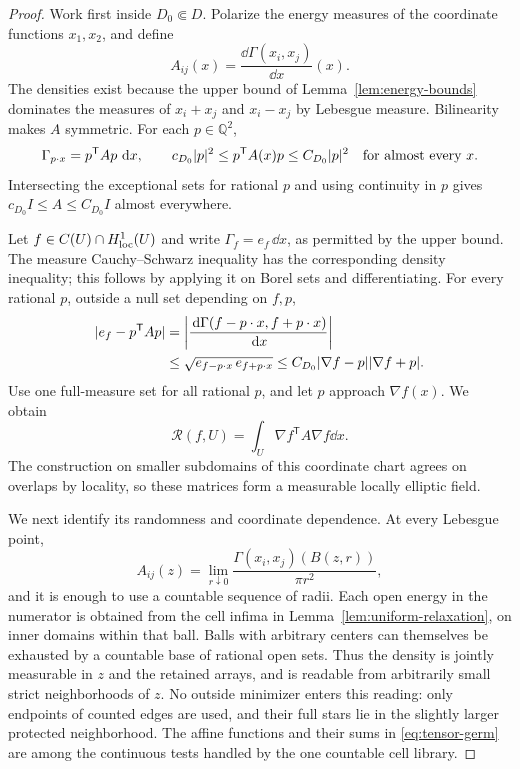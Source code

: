 \begin{proof}
Work first inside \(D_0\Subset D\).  Polarize the energy measures of
the coordinate functions \(x_1,x_2\), and define
\[
 A_{ij}(x)=\frac{\dd\Gamma(x_i,x_j)}{\dd x}(x).
\]
The densities exist because the upper bound of
Lemma~\ref{lem:energy-bounds} dominates the measures of
\(x_i+x_j\) and \(x_i-x_j\) by Lebesgue measure.  Bilinearity makes
\(A\) symmetric.  For each \(p\in\mathbb Q^2\),
\[
 \Gamma_{p\cdot x}=p^{\mathsf T}A p\,\,\mathrm d x,\qquad
 c_{D_0}\lvert p\rvert^2\le p^{\mathsf T}A(x)p
          \le C_{D_0}\lvert p\rvert^2
 \quad\text{for almost every }x.
\]
Intersecting the exceptional sets for rational \(p\) and using continuity
in \(p\) gives \(c_{D_0}I\le A\le C_{D_0}I\) almost everywhere.

Let \(f\in C(U)\cap H^1_{\rm loc}(U)\) and write
\(\Gamma_f=e_f\,\dd x\), as permitted by the upper bound.  The
measure Cauchy--Schwarz inequality has the corresponding density
inequality; this follows by applying it on Borel sets and differentiating.
For every rational \(p\), outside a null set depending on \(f,p\),
\[
 \begin{split}
 \lvert e_f-p^{\mathsf T}A p\rvert
 &=\left|\frac{\,\mathrm d\Gamma(f-p\cdot x,f+p\cdot x)}{\,\mathrm d x}\right|\\
 &\le \sqrt{e_{f-p\cdot x}\,e_{f+p\cdot x}}
 \le C_{D_0}\lvert \nabla f-p\rvert\lvert \nabla f+p\rvert.
 \end{split}
\]
Use one full-measure set for all rational \(p\), and let \(p\) approach
\(\nabla f(x)\).  We obtain
\begin{equation}\label{eq:tensor-relaxation}
 \mathcal R(f,U)=\int_U\nabla f^{\mathsf T}A\nabla f\dd x.
\end{equation}
The construction on smaller subdomains of this coordinate chart agrees
on overlaps by locality,
so these matrices form a measurable locally elliptic field.

We next identify its randomness and coordinate dependence.  At every
Lebesgue point,
\begin{equation}\label{eq:tensor-germ}
 A_{ij}(z)=\lim_{r\downarrow0}
   \frac{\Gamma(x_i,x_j)(B(z,r))}{\pi r^2},
\end{equation}
and it is enough to use a countable sequence of radii.  Each open energy
in the numerator is obtained from the cell infima in
Lemma~\ref{lem:uniform-relaxation}, on inner domains within that ball.
Balls with arbitrary centers can themselves be exhausted by a countable
base of rational open sets.  Thus the density is jointly measurable in
\(z\) and the retained arrays, and is readable from arbitrarily small
strict neighborhoods of \(z\).  No outside minimizer enters this reading:
only endpoints of counted edges are used, and their full stars lie in
the slightly larger protected neighborhood.  The affine functions and
their sums in \eqref{eq:tensor-germ} are among the continuous tests
handled by the one countable cell library.


\end{proof}
